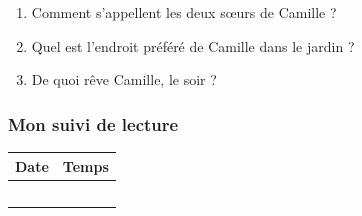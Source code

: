 \documentclass[
  french,
  french,
  14pt,
  a4paper]{extarticle}
\providecommand{\tightlist}{%
  \setlength{\itemsep}{0pt}\setlength{\parskip}{0pt}}
\begin{document}
{\begin{enumerate}
\def\labelenumi{\arabic{enumi}.}
\tightlist
\item
  Comment s'appellent les deux sœurs de Camille ?
\item
  Quel est l'endroit préféré de Camille dans le jardin ?
\item
  De quoi rêve Camille, le soir ?
\end{enumerate}

\subsubsection{Mon suivi de lecture}\label{mon-suivi-de-lecture}

\begin{center}
\begin{tabularx}{\textwidth}{|X|X|}
\hline
\textbf{Date} & \textbf{Temps} \\
\hline
& \\
\hline
& \\
\hline
& \\
\hline
& \\
\hline
& \\
\hline
\end{tabularx}
\end{center}

}%
\newpage
\end{document}
